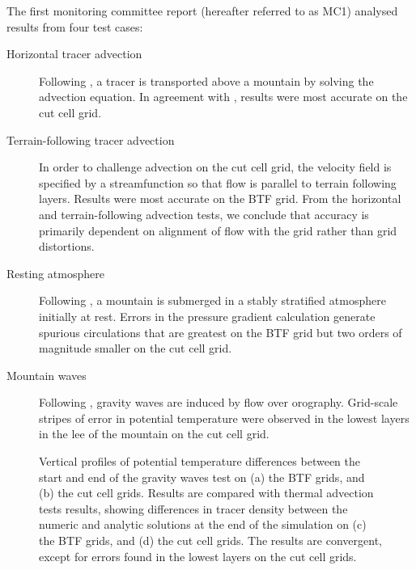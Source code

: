 \documentclass[a4paper]{article}
\begin{document}
The first monitoring committee report (hereafter referred to as MC1) analysed results from four test cases:
\begin{description}
	\item[Horizontal tracer advection]{Following \citet{schaer2002}, a tracer is transported above a mountain by solving the advection equation.  In agreement with \citet{good2014}, results were most accurate on the cut cell grid.}
	\item[Terrain-following tracer advection]{In order to challenge advection on the cut cell grid, the velocity field is specified by a streamfunction so that flow is parallel to terrain following layers.  Results were most accurate on the BTF grid.  From the horizontal and terrain-following advection tests, we conclude that accuracy is primarily dependent on alignment of flow with the grid rather than grid distortions.}
	\item[Resting atmosphere]{Following \citet{klemp2011}, a mountain is submerged in a stably stratified atmosphere initially at rest.  Errors in the pressure gradient calculation generate spurious circulations that are greatest on the BTF grid but two orders of magnitude smaller on the cut cell grid.}
	\item[Mountain waves]{Following \citet{schaer2002}, gravity waves are induced by flow over orography.  Grid-scale stripes of error in potential temperature were observed in the lowest layers in the lee of the mountain on the cut cell grid.}
\end{description}

\begin{figure}
	\centering
	\footnotesize
	
%
	\caption{Vertical profiles of potential temperature differences between the start and end of the gravity waves test on (a) the BTF grids, and (b) the cut cell grids.  Results are compared with thermal advection tests results, showing differences in tracer density between the numeric and analytic solutions at the end of the simulation on (c) the BTF grids, and (d) the cut cell grids.  The results are convergent, except for errors found in the lowest layers on the cut cell grids.}
	\label{fig:sampleLines}
\end{figure}
\end{document}
